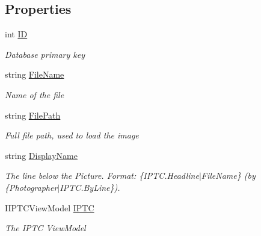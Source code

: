 \subsection*{Properties}
\begin{DoxyCompactItemize}
\item 
int \mbox{\hyperlink{class_pic_d_b_1_1_models_1_1_picture_view_model_a6269ce3cc7ecce04255c0571b9b01195}{ID}}
\begin{DoxyCompactList}\small\item\em Database primary key \end{DoxyCompactList}\item 
string \mbox{\hyperlink{class_pic_d_b_1_1_models_1_1_picture_view_model_ad29ee890a856d2de97e31720c2b5b9a8}{File\+Name}}
\begin{DoxyCompactList}\small\item\em Name of the file \end{DoxyCompactList}\item 
string \mbox{\hyperlink{class_pic_d_b_1_1_models_1_1_picture_view_model_ae217d3d4bc1abf06bcab89894efc1fb1}{File\+Path}}
\begin{DoxyCompactList}\small\item\em Full file path, used to load the image \end{DoxyCompactList}\item 
string \mbox{\hyperlink{class_pic_d_b_1_1_models_1_1_picture_view_model_aa16455db9849886fcbc86cc05b5ea48d}{Display\+Name}}
\begin{DoxyCompactList}\small\item\em The line below the Picture. Format\+: \{I\+P\+T\+C.\+Headline$\vert$\+File\+Name\} (by \{Photographer$\vert$\+I\+P\+TC.By\+Line\}). \end{DoxyCompactList}\item 
I\+I\+P\+T\+C\+View\+Model \mbox{\hyperlink{class_pic_d_b_1_1_models_1_1_picture_view_model_a25d71469f6c5a78cfd34db852f41ad5c}{I\+P\+TC}}
\begin{DoxyCompactList}\small\item\em The I\+P\+TC View\+Model \end{DoxyCompactList}\item 

\end{DoxyCompactItemize}
